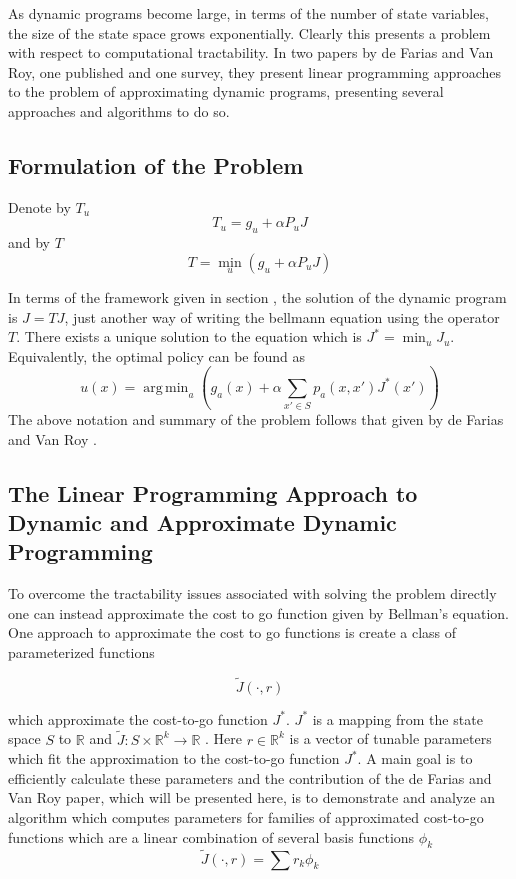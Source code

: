 \documentclass[12pt,reqno]{amsart}
\newcommand{\R}{\ensuremath{\mathbb{R}}}
\numberwithin{equation}{section}
\DeclareMathOperator*{\argmin}{arg\,min}
\begin{document}
As dynamic programs become large, in terms of the number of state variables, the size of the state space grows exponentially. Clearly this presents a problem with respect to computational tractability. In two papers by de Farias and Van Roy, one published and one survey, they present linear programming approaches to the problem of approximating dynamic programs, presenting several approaches and algorithms to do so.

\subsection{Formulation of the Problem}
Denote by $T_u$
$$
T_u = g_u + \alpha P_uJ
$$
and by $T$
$$
T = \min_u(g_u + \alpha P_uJ)
$$

In terms of the framework given in section , the solution of the dynamic program is $J = TJ$, just another way of writing the bellmann equation using the operator $T$. There exists a unique solution to the equation which is $J^* = \min_u J_u$. Equivalently, the optimal policy can be found as
$$
u(x) = \argmin_a (g_a(x) + \alpha \sum_{x' \in S} p_a(x,x')J^*(x'))
$$
The above notation and summary of the problem follows that given by de Farias and Van Roy \cite{FV}.

\subsection{The Linear Programming Approach to Dynamic and Approximate Dynamic Programming}

To overcome the tractability issues associated with solving the problem directly one can instead approximate the cost to go function given by Bellman's equation. One approach to approximate the cost to go functions is create a class of parameterized functions

$$
\tilde{J}(\cdot,r)
$$

which approximate the cost-to-go function $J^*$. $J^*$ is a mapping from the state space $S$ to $\R$ and $\tilde{J} : S \times \R^k \rightarrow \R$ \cite{FV}. Here $r \in \R^k$ is a vector of tunable parameters which fit the approximation to the cost-to-go function $J^*$. A main goal is to efficiently calculate these parameters and the contribution of the de Farias and Van Roy paper, which will be presented here, is to demonstrate and analyze an algorithm which computes parameters for families of approximated cost-to-go functions which are a linear combination of several basis functions $\phi_k$
$$
\tilde{J}(\cdot,r)  = \sum r_k \phi_k
$$
\end{document}

